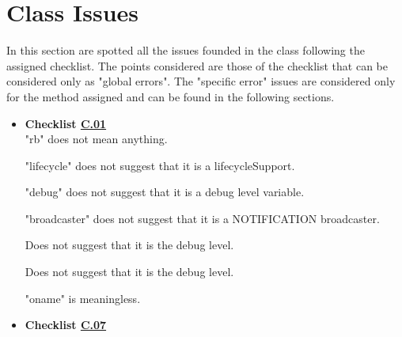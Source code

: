 \documentclass[../../../../codeInspection.tex]{subfiles}
\begin{document}
	\section{Class Issues}

		In this section are spotted all the issues founded in the class following the assigned checklist. The points considered are those of the checklist that can be considered only as "global errors".
		The "specific error" issues are considered only for the method assigned and can be found in the following sections.

		\begin{itemize}

			\item \textbf{Checklist \hyperref[C:01]{C.01}} \\

				  

				  "rb" does not mean anything.

				  

				  "lifecycle" does not suggest that it is a lifecycleSupport.

				  

				  "debug" does not suggest that it is a debug level variable.

				  

				  "broadcaster" does not suggest that it is a NOTIFICATION broadcaster.

				  

				  Does not suggest that it is the debug level.

				  

				  Does not suggest that it is the debug level.

				  

				  "oname" is meaningless.

		    \item \textbf{Checklist \hyperref[C:07]{C.07}}


\end{itemize}
\end{document}
